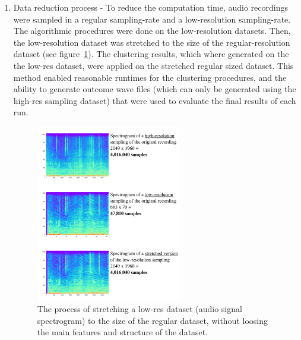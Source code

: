 \documentclass[10pt,twocolumn]{article}
\begin{document}
\begin{enumerate}
  \item Data reduction process - To reduce the computation time, audio recordings were sampled in a regular sampling-rate and a low-resolution sampling-rate. The algorithmic procedures were done on the low-resolution datasets. Then, the low-resolution dataset was stretched to the size of the regular-resolution dataset (see figure~\ref{res}). The clustering results, which where generated on the the low-res dataset, were applied on the stretched regular sized dataset. This method enabled reasonable runtimes for the clustering procedures, and the ability to generate outcome wave files (which can only be generated using the high-res sampling dataset) that were used to evaluate the final results of each run.
  \begin{figure}[!h]
    \begin{center}
      \includegraphics[width=2.5in]{images/06.png}
    \end{center}
    \caption{The process of stretching a low-res dataset (audio signal spectrogram) to the size of the regular dataset, without loosing the main features and structure of the dataset.}
    \label{res}
  \end{figure}


\end{enumerate}
\end{document}
